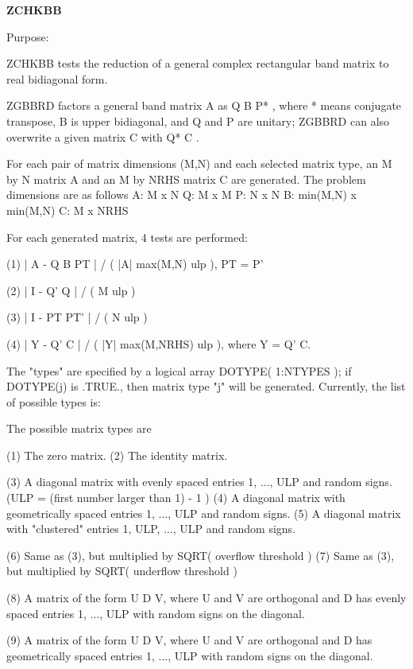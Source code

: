 {\bfseries Z\+C\+H\+K\+B\+B} 

\begin{DoxyParagraph}{Purpose\+: }
\begin{DoxyVerb} ZCHKBB tests the reduction of a general complex rectangular band
 matrix to real bidiagonal form.

 ZGBBRD factors a general band matrix A as  Q B P* , where * means
 conjugate transpose, B is upper bidiagonal, and Q and P are unitary;
 ZGBBRD can also overwrite a given matrix C with Q* C .

 For each pair of matrix dimensions (M,N) and each selected matrix
 type, an M by N matrix A and an M by NRHS matrix C are generated.
 The problem dimensions are as follows
    A:          M x N
    Q:          M x M
    P:          N x N
    B:          min(M,N) x min(M,N)
    C:          M x NRHS

 For each generated matrix, 4 tests are performed:

 (1)   | A - Q B PT | / ( |A| max(M,N) ulp ), PT = P'

 (2)   | I - Q' Q | / ( M ulp )

 (3)   | I - PT PT' | / ( N ulp )

 (4)   | Y - Q' C | / ( |Y| max(M,NRHS) ulp ), where Y = Q' C.

 The "types" are specified by a logical array DOTYPE( 1:NTYPES );
 if DOTYPE(j) is .TRUE., then matrix type "j" will be generated.
 Currently, the list of possible types is:

 The possible matrix types are

 (1)  The zero matrix.
 (2)  The identity matrix.

 (3)  A diagonal matrix with evenly spaced entries
      1, ..., ULP  and random signs.
      (ULP = (first number larger than 1) - 1 )
 (4)  A diagonal matrix with geometrically spaced entries
      1, ..., ULP  and random signs.
 (5)  A diagonal matrix with "clustered" entries 1, ULP, ..., ULP
      and random signs.

 (6)  Same as (3), but multiplied by SQRT( overflow threshold )
 (7)  Same as (3), but multiplied by SQRT( underflow threshold )

 (8)  A matrix of the form  U D V, where U and V are orthogonal and
      D has evenly spaced entries 1, ..., ULP with random signs
      on the diagonal.

 (9)  A matrix of the form  U D V, where U and V are orthogonal and
      D has geometrically spaced entries 1, ..., ULP with random
      signs on the diagonal.


\end{DoxyVerb}
\end{DoxyParagraph}
